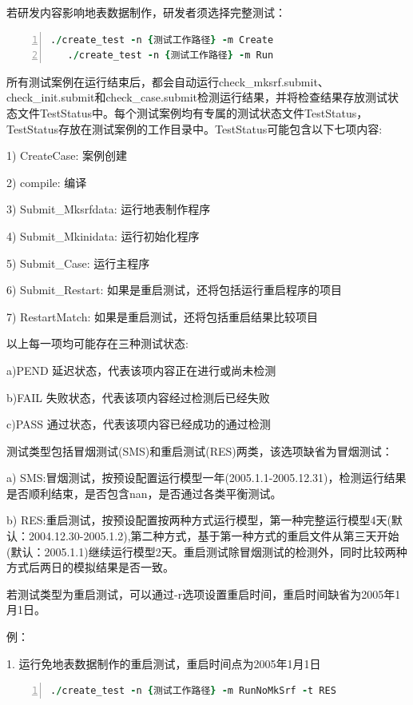 若研发内容影响地表数据制作，研发者须选择完整测试：

\begin{lstlisting}[language=fortran, basicstyle=\linespread{1.0}\footnotesize\ttfamily, commentstyle=\color{olive}, numbers=left, numberstyle=\tiny, xleftmargin=1.5em,xrightmargin=0em, aboveskip=1em]
   ./create_test -n {测试工作路径} -m Create
   ./create_test -n {测试工作路径} -m Run
\end{lstlisting}

所有测试案例在运行结束后，都会自动运行check\_mksrf.submit、check\_init.submit和check\_case.submit检测运行结果，并将检查结果存放测试状态文件TestStatus中。每个测试案例均有专属的测试状态文件TestStatus，TestStatus存放在测试案例的工作目录中。TestStatus可能包含以下七项内容:

1) CreateCase: 案例创建

2) compile: 编译

3) Submit\_Mksrfdata: 运行地表制作程序

4) Submit\_Mkinidata: 运行初始化程序

5) Submit\_Case: 运行主程序

6) Submit\_Restart: 如果是重启测试，还将包括运行重启程序的项目

7) RestartMatch: 如果是重启测试，还将包括重启结果比较项目

以上每一项均可能存在三种测试状态:

a)PEND 延迟状态，代表该项内容正在进行或尚未检测

b)FAIL 失败状态，代表该项内容经过检测后已经失败

c)PASS 通过状态，代表该项内容已经成功的通过检测

{测试类型}包括冒烟测试(SMS)和重启测试(RES)两类，该选项缺省为冒烟测试：

a) SMS:冒烟测试，按预设配置运行模型一年(2005.1.1-2005.12.31)，检测运行结果是否顺利结束，是否包含nan，是否通过各类平衡测试。

b) RES:重启测试，按预设配置按两种方式运行模型，第一种完整运行模型4天(默认：2004.12.30-2005.1.2),第二种方式，基于第一种方式的重启文件从第三天开始(默认：2005.1.1)继续运行模型2天。重启测试除冒烟测试的检测外，同时比较两种方式后两日的模拟结果是否一致。

若测试类型为重启测试，可以通过-r选项设置重启时间，重启时间缺省为2005年1月1日。

例：

1. 运行免地表数据制作的重启测试，重启时间点为2005年1月1日
\begin{lstlisting}[language=fortran, basicstyle=\linespread{1.0}\footnotesize\ttfamily, commentstyle=\color{olive}, numbers=left, numberstyle=\tiny, xleftmargin=1.5em,xrightmargin=0em, aboveskip=1em]
   ./create_test -n {测试工作路径} -m RunNoMkSrf -t RES
\end{lstlisting}


